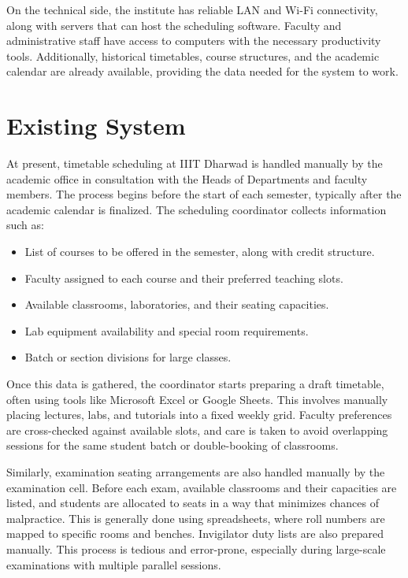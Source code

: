 \documentclass[12pt]{article}
\begin{document}
On the technical side, the institute has reliable LAN and Wi-Fi connectivity, along with servers that can host the scheduling software. Faculty and administrative staff have access to computers with the necessary productivity tools. Additionally, historical timetables, course structures, and the academic calendar are already available, providing the data needed for the system to work.

\section{Existing System}

At present, timetable scheduling at IIIT Dharwad is handled manually by the academic office in consultation with the Heads of Departments and faculty members. The process begins before the start of each semester, typically after the academic calendar is finalized. The scheduling coordinator collects information such as:

\begin{itemize}
    \item List of courses to be offered in the semester, along with credit structure.
    \item Faculty assigned to each course and their preferred teaching slots.
    \item Available classrooms, laboratories, and their seating capacities.
    \item Lab equipment availability and special room requirements.
    \item Batch or section divisions for large classes.
\end{itemize}

Once this data is gathered, the coordinator starts preparing a draft timetable, often using tools like Microsoft Excel or Google Sheets. This involves manually placing lectures, labs, and tutorials into a fixed weekly grid. Faculty preferences are cross-checked against available slots, and care is taken to avoid overlapping sessions for the same student batch or double-booking of classrooms.

Similarly, examination seating arrangements are also handled manually by the examination cell. Before each exam, available classrooms and their capacities are listed, and students are allocated to seats in a way that minimizes chances of malpractice. This is generally done using spreadsheets, where roll numbers are mapped to specific rooms and benches. Invigilator duty lists are also prepared manually. This process is tedious and error-prone, especially during large-scale examinations with multiple parallel sessions.
\end{document}
